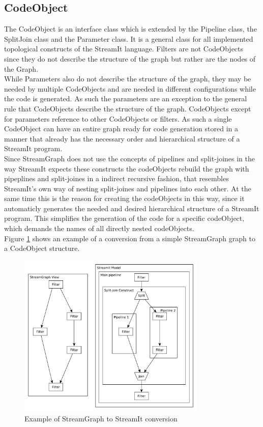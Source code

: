 \documentclass[journal]{IEEEtran}
\begin{document}
\subsection{CodeObject}
\noindent The CodeObject is an interface class which is extended by the Pipeline
class, the SplitJoin class and the Parameter class. It is a general class for
all implemented topological constructs of the StreamIt language. Filters are not
CodeObjects since they do not describe the structure of the graph but rather are
the nodes of the Graph.\\
While Parameters also do not describe the structure of the graph, they may be
needed by multiple CodeObjects and are needed in different configurations while
the code is generated. As such the parameters are an exception to the general
rule that CodeObjects describe the structure of the graph. CodeObjects except
for parameters reference to other CodeObjects or filters. As such a single
CodeObject can have an entire graph ready for code generation stored in a manner
that already has the necessary order and hierarchical structure of a StreamIt
program.\\
Since StreamGraph does not use the concepts of pipelines and split-joines in 
the way StreamIt expects these constructs the codeObjects rebuild the graph 
with pipeplines and split-joines in a indirect recursive fashion, that 
resembles StreamIt's own way of nesting split-joines and pipelines into 
each other. At the same time this is the reason for creating the 
codeObjects in this way, since it automaticly generates the needed 
and desired hierarchical structure of a StreamIt program. This 
simplifies the generation of the code for a specific codeObject, 
which demands the names of all directly nested codeObjects.\\
Figure \ref{fig_StreamGraph_To_StreamIt} shows an example of a 
conversion from a simple StreamGraph graph to a CodeObject structure.\\

\begin{figure}[h]
	\centering
	\includegraphics[width=0.8\textwidth]{StreamGraphToStreamIt}
	\caption{Example of StreamGraph to StreamIt conversion}
	\label{fig_StreamGraph_To_StreamIt}
\end{figure}
\end{document}
